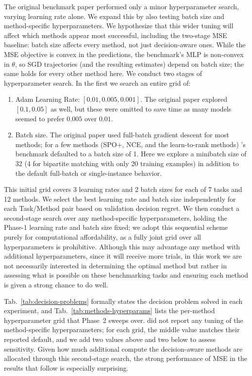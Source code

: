 The original benchmark paper performed only a minor hyperparameter search, varying learning rate alone. We expand this by also testing batch size and method-specific hyperparameters. We hypothesize that this wider tuning will affect which methods appear most successful, including the two-stage MSE baseline: batch size affects every method, not just decision-aware ones. While the MSE objective is convex in the predictions, the benchmark's MLP is non-convex in $\theta$, so SGD trajectories (and the resulting estimates) depend on batch size; the same holds for every other method here. We conduct two stages of hyperparameter search. In the first we search an entire grid of:
\begin{enumerate}
    \item Adam Learning Rate: $[0.01, 0.005, 0.001]$. The original paper explored $[0.1, 0.05]$ as well, but these were omitted to save time as many models seemed to prefer $0.005$ over $0.01$.
    \item Batch size. The original paper used full-batch gradient descent for most methods; for a few methods (SPO+, NCE, and the learn-to-rank methods) \citeauthor{gengBenchmarkingPtOPnO2024}'s benchmark defaulted to a batch size of 1. Here we explore a minibatch size of 32 (4 for bipartite matching with only 20 training examples) in addition to the default full-batch or single-instance behavior.
\end{enumerate}

This initial grid covers 3 learning rates and 2 batch sizes for each of 7 tasks and 12 methods. We select the best learning rate and batch size independently for each Task/Method pair based on validation decision regret. We then conduct a second-stage search over any method-specific hyperparameters, holding the Phase-1 learning rate and batch size fixed; we adopt this sequential scheme purely for computational affordability, as a fully joint grid over all hyperparameters is prohibitive. Although this may advantage any method with additional hyperparameters, since it will receive more trials, in this work we are not necessarily interested in determining the optimal method but rather in assessing what is possible on these benchmarking tasks and ensuring each method is given a strong chance to do well.

Tab.~\ref{tab:decision-problems} formally states the decision problem solved in each experiment, and Tab.~\ref{tab:methods-hyperparams} lists the per-method hyperparameter grid that Phase~2 sweeps over. \citet{gengBenchmarkingPtOPnO2024} did not report any tuning of the method-specific hyperparameters; for each grid, the middle value matches their reported default, and we add two values above and two below to assess sensitivity. Given how much additional compute the decision-aware methods are allocated through this second-stage search, the strong performance of MSE in the results that follow is especially surprising.




